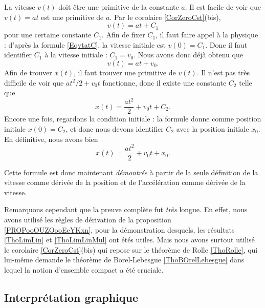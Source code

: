 La vitesse \( v(t)\) doit être une primitive de la constante \( a\). Il est facile de voir que \( v(t)=at\) est une primitive de \( a\). Par le corolaire \ref{CorZeroCst}(bis),
\begin{equation}    \label{EqvtatC}
	v(t)=at+C_1
\end{equation}
pour une certaine constante \( C_1\). Afin de fixer \( C_1\), il faut faire appel à la physique : d'après la formule \eqref{EqvtatC}, la vitesse initiale est \( v(0)=C_1\). Donc il faut identifier \( C_1\) à la vitesse initiale : \( C_1=v_0\). Nous avons donc déjà obtenu que
\begin{equation}
	v(t)=at+v_0.
\end{equation}
Afin de trouver \( x(t)\), il faut trouver une primitive de \( v(t)\). Il n'est pas très difficile de voir que \( at^2/2 + v_0t\) fonctionne, donc il existe une constante \( C_2\) telle que
\begin{equation}
	x(t)=\frac{ at^2 }{ 2 }+v_0t+C_2.
\end{equation}
Encore une fois, regardons la condition initiale : la formule donne comme position initiale \( x(0)=C_2\), et donc nous devons identifier \( C_2\) avec la position initiale \( x_0\). En définitive, nous avons bien
\begin{equation}
	x(t) = \frac{ at^2 }{ 2 } + v_0t +x_0.
\end{equation}

Cette formule est donc maintenant \emph{démontrée} à partir de la seule définition de la vitesse comme dérivée de la position et de l'accélération comme dérivée de la vitesse.

Remarquons cependant que la preuve complète fut \emph{très} longue. En effet, nous avons utilisé les règles de dérivation de la proposition \ref{PROPooOUZOooEcYKxn}, pour la démonstration desquels, les résultats \ref{ThoLimLin} et \ref{ThoLimLinMul} ont étés utiles. Mais nous avons surtout utilisé le corolaire \ref{CorZeroCst}(bis) qui repose sur le théorème de Rolle \ref{ThoRolle}, qui lui-même demande le théorème de Borel-Lebesgue \ref{ThoBOrelLebesgue} dans lequel la notion d'ensemble compact a été cruciale.

\subsection{Interprétation graphique}

